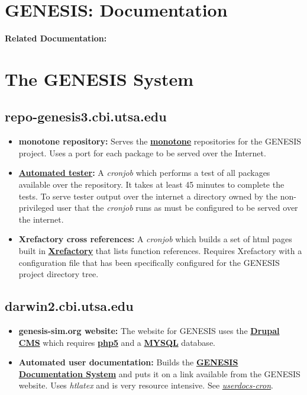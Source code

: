 \documentclass[12pt]{article}
\begin{document}
\section*{GENESIS: Documentation}

{\bf Related Documentation:}

\section*{The GENESIS System}

\subsection*{\bf repo-genesis3.cbi.utsa.edu}

\begin{itemize}

\item {\bf monotone repository:} Serves the \href{http://www.monotone.ca/}{\bf monotone} repositories for the GENESIS project. Uses a port for each package to be served over the Internet.

\item {\bf \href{../neurospaces-tester/neurospaces-tester.tex}{Automated tester}:} A {\it cronjob} which performs a test of all packages available over the repository.  It takes at least 45 minutes to complete the tests. To serve tester output over the internet a directory owned by the non-privileged user that the {\it cronjob} runs as must be configured to be served over the internet.

\item {\bf Xrefactory cross references:} A {\it cronjob} which builds a set of html pages built in \href{http://www.xref-tech.com/xrefactory/main.html}{\bf Xrefactory} that lists function references.  Requires Xrefactory with a configuration file that has been specifically configured for the GENESIS project directory tree. 

\end{itemize}

\subsection*{\bf darwin2.cbi.utsa.edu}

\begin{itemize}

\item {\bf genesis-sim.org website:} The website for GENESIS uses the \href{http://drupal.org/}{\bf Drupal CMS} which requires \href{http://www.php.net/}{\bf php5} and a \href{http://www.mysql.com/}{\bf MYSQL} database.

\item {\bf Automated user documentation:} Builds the \href{../documentation-overview/documentation-overview.tex}{\bf GENESIS Documentation System} and puts it on a link available from the GENESIS website.  Uses {\it htlatex} and is very resource intensive.  See \href{../userdocs-cron/userdocs-cron.tex}{\it userdocs-cron}.

\end{itemize}
\end{document}
